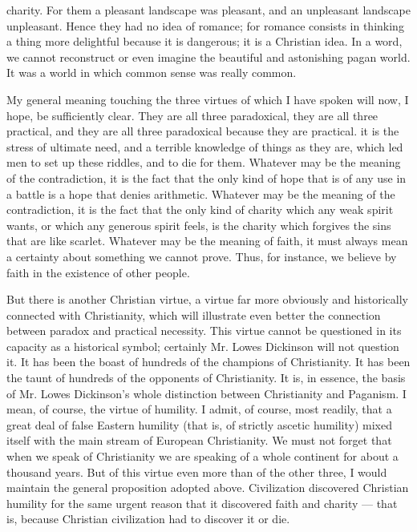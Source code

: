 charity. For them a pleasant landscape was pleasant, and an unpleasant landscape unpleasant. Hence they had no idea of romance; for romance consists in thinking a thing more delightful because it is dangerous; it is a Christian idea. In a word, we cannot reconstruct or even imagine the beautiful and astonishing pagan world. It was a world in which common sense was really common.

My general meaning touching the three virtues of which I have spoken will now, I hope, be sufficiently clear. They are all three paradoxical, they are all three practical, and they are all three paradoxical because they are practical. it is the stress of ultimate need, and a terrible knowledge of things as they are, which led men to set up these riddles, and to die for them. Whatever may be the meaning of the contradiction, it is the fact that the only kind of hope that is of any use in a battle is a hope that denies arithmetic. Whatever may be the meaning of the contradiction, it is the fact that the only kind of charity which any weak spirit wants, or which any generous spirit feels, is the charity which forgives the sins that are like scarlet. Whatever may be the meaning of faith, it must always mean a certainty about something we cannot prove. Thus, for instance, we believe by faith in the existence of other people.

But there is another Christian virtue, a virtue far more obviously and historically connected with Christianity, which will illustrate even better the connection between paradox and practical necessity. This virtue cannot be questioned in its capacity as a historical symbol; certainly Mr. Lowes Dickinson will not question it. It has been the boast of hundreds of the champions of Christianity. It has been the taunt of hundreds of the opponents of Christianity. It is, in essence, the basis of Mr. Lowes Dickinson’s whole distinction between Christianity and Paganism. I mean, of course, the virtue of humility. I admit, of course, most readily, that a great deal of false Eastern humility (that is, of strictly ascetic humility) mixed itself with the main stream of European Christianity. We must not forget that when we speak of Christianity we are speaking of a whole continent for about a thousand years. But of this virtue even more than of the other three, I would maintain the general proposition adopted above. Civilization discovered Christian humility for the same urgent reason that it discovered faith and charity — that is, because Christian civilization had to discover it or die.

